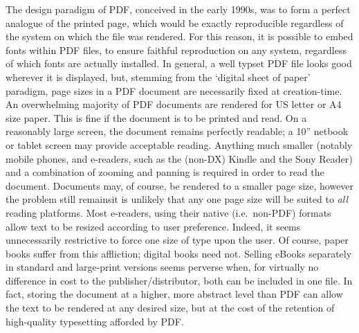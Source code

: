 The design paradigm of PDF, conceived in the early 1990s\cite{Warnock1991}, was to form a perfect
analogue of the printed page, which would be exactly reproducible regardless of the system on which
the file was rendered. For this reason, it is possible to embed fonts within PDF files, to ensure
faithful reproduction on any system, regardless of which fonts are actually installed. In general, a
well typset PDF file looks good wherever it is displayed, but, stemming from the `digital sheet of
paper' paradigm, page sizes in a PDF document are necessarily fixed at creation-time. An
overwhelming majority of PDF documents are rendered for  US letter or A4 size paper. This is fine if
the document is to be printed and read. On a reasonably large screen, the document remains perfectly
readable; a 10'' netbook or tablet screen may provide acceptable reading. Anything much smaller
(notably mobile phones, and e-readers, such as the (non-DX) Kindle and the Sony Reader) and a
combination of zooming and panning is required 
in order to read the document. Documents may, of course, be rendered to a smaller page size, however
the problem still remains\ed it is unlikely that any one page size will be suited to \emph{all}
reading platforms. Most e-readers, using their native (i.e.\ non-PDF) formats allow text to be
resized according to user preference. Indeed, it seems unnecessarily restrictive to force one size
of type upon the user. Of course, paper books suffer from this affliction; digital books need not.
Selling eBooks separately in standard and large-print versions seems perverse when, for virtually no
difference in cost to the publisher/distributor, both can be included in one file. In fact, storing
the document at a higher, more abstract level than PDF can allow the text to be rendered at any
desired size, but at the cost of the retention of high-quality typesetting afforded by PDF.


